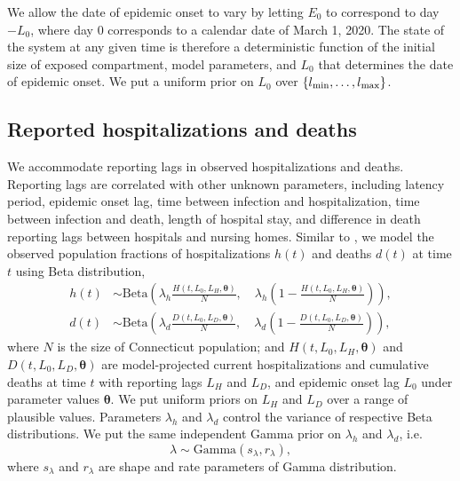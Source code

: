 \documentclass[11pt]{article}
\newcommand{\btheta}{\boldsymbol{\theta}}
\begin{document}
We allow the date of epidemic onset to vary by letting $E_0$ to correspond to day $-L_0$, where day $0$ corresponds to a calendar date of March 1, 2020. 
The state of the system at any given time is therefore a deterministic function of the initial size of exposed compartment, model parameters, and $L_0$ that determines the date of epidemic onset. We put a uniform prior on $L_{0}$ over $\{l\textsubscript{min}, \ldots, l\textsubscript{max}\}$.



\subsection{Reported hospitalizations and deaths} 

We accommodate reporting lags in observed hospitalizations and deaths. Reporting lags are correlated with other unknown parameters, including latency period, epidemic onset lag, time between infection and hospitalization, time between infection and death, length of hospital stay, and difference in death reporting lags between hospitals and nursing homes. Similar to \citet{osthus2017forecasting}, we model the observed population fractions of hospitalizations $h(t)$ and deaths $d(t)$ at time $t$ using Beta distribution,  
\begin{align}
h(t) &\sim \mbox{Beta} \left( \lambda_h \frac{H(t, L_0, L_H, \btheta)}{N}, \quad \lambda_h  \left( 1 - \frac{H(t, L_0, L_H, \btheta)}{N} \right) \right), \\
d(t) &\sim \mbox{Beta} \left( \lambda_d \frac{D(t, L_0, L_D, \btheta)}{N}, \quad \lambda_d  \left( 1 - \frac{D(t, L_0, L_D, \btheta)}{N} \right) \right), 
\end{align}
where $N$ is the size of Connecticut population; and $H(t, L_0, L_H, \btheta)$ and $D(t, L_0, L_D, \btheta)$ are model-projected current hospitalizations and cumulative deaths at time $t$ with reporting lags $L_H$ and $L_D$, and epidemic onset lag $L_0$ under parameter values $\btheta$. We put uniform priors on $L_H$ and $L_D$ over a range of plausible values.  Parameters $\lambda_h$ and $\lambda_d$ control the variance of respective Beta distributions. We put the same independent Gamma prior on $\lambda_h$ and $\lambda_d$, i.e.
\begin{equation}
\lambda \sim \mbox{Gamma} (s_\lambda, r_\lambda),
\label{eq:lamprior}
\end{equation}
where $s_\lambda$ and $r_\lambda$ are shape and rate parameters of Gamma distribution. 
\end{document}
